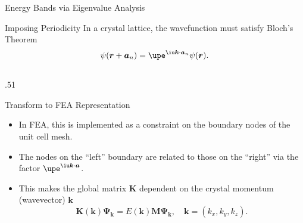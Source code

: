 \documentclass[svgnames, aspectratio = 1610]{beamer}
\begin{document}
\begin{frame}{Energy Bands via Eigenvalue Analysis}
  \begin{block}{Imposing Periodicity}
    In a crystal lattice, the wavefunction must satisfy \alert{Bloch's Theorem}
    \[
      \psi(\bm r + \bm a_n) = \upe^{\iu \bm k \cdot \bm a_n} \psi(\bm r).
    \]
  \end{block}
  \pause
  \begin{columns}
    \begin{column}{.51\linewidth}
      \begin{exampleblock}{Transform to FEA Representation}
        \begin{itemize}[<+->]
          \item In FEA, this is implemented as a constraint on the boundary
          nodes of the unit cell mesh.
          \item The nodes on the ``left'' boundary are related to those on
          the ``right'' via the factor $\upe^{\iu \bm k \cdot \bm a}$.
          \item This makes the global matrix $\mathbf{K}$ dependent on the
          crystal momentum (wavevector) $\bm k$
          \[
            \mathbf K(\bm k) \bm \Psi_{\bm k}
          = E(\bm k) \mathbf M \bm \Psi_{\bm k},
            \quad
            \bm k = (k_x, k_y, k_z).
          \]
          \vskip-6pt
        \end{itemize}
      \end{exampleblock}
    \end{column}
  \end{columns}
\end{frame}
\end{document}
